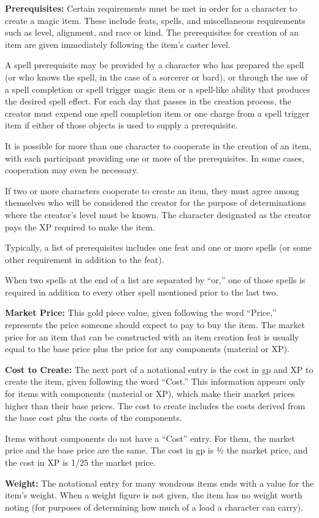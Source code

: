 \textbf{Prerequisites:} Certain requirements must be met in order for a character to create a magic item. These include feats, spells, and miscellaneous requirements such as level, alignment, and race or kind. The prerequisites for creation of an item are given immediately following the item's caster level.

A spell prerequisite may be provided by a character who has prepared the spell (or who knows the spell, in the case of a sorcerer or bard), or through the use of a spell completion or spell trigger magic item or a spell-like ability that produces the desired spell effect. For each day that passes in the creation process, the creator must expend one spell completion item or one charge from a spell trigger item if either of those objects is used to supply a prerequisite.

It is possible for more than one character to cooperate in the creation of an item, with each participant providing one or more of the prerequisites. In some cases, cooperation may even be necessary.

If two or more characters cooperate to create an item, they must agree among themselves who will be considered the creator for the purpose of determinations where the creator's level must be known. The character designated as the creator pays the XP required to make the item.

Typically, a list of prerequisites includes one feat and one or more spells (or some other requirement in addition to the feat).

When two spells at the end of a list are separated by ``or,'' one of those spells is required in addition to every other spell mentioned prior to the last two.

\textbf{Market Price:} This gold piece value, given following the word ``Price,'' represents the price someone should expect to pay to buy the item. The market price for an item that can be constructed with an item creation feat is usually equal to the base price plus the price for any components (material or XP).

\textbf{Cost to Create:} The next part of a notational entry is the cost in gp and XP to create the item, given following the word ``Cost.'' This information appears only for items with components (material or XP), which make their market prices higher than their base prices. The cost to create includes the costs derived from the base cost plus the costs of the components.

Items without components do not have a ``Cost'' entry. For them, the market price and the base price are the same. The cost in gp is ½ the market price, and the cost in XP is 1/25 the market price.

\textbf{Weight:} The notational entry for many wondrous items ends with a value for the item's weight. When a weight figure is not given, the item has no weight worth noting (for purposes of determining how much of a load a character can carry). 